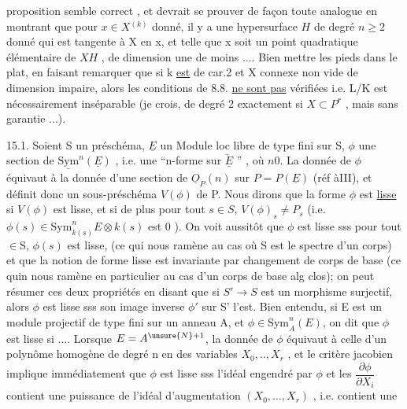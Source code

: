 
proposition semble correct , et devrait se prouver de façon toute analogue
en montrant que pour $x\in X$$^{(k)}$ donné, il y a une hypersurface $H$ de degré $n\geqslant 2$
donné qui est tangente à X en x, et telle que x soit un point quadratique
élémentaire de $X$\hand{\unsure{$\cap$}}$H$ , de dimension une de moins .... Bien mettre les
pieds dans le plat, en faisant remarquer que si k \uline{est} de car.2 et X
connexe non vide de dimension impaire, alors les conditions de 8.8. \uline{ne sont pas}
vérifiées i.e. L/K est nécessairement inséparable (je crois, de degré
2 exactement si $X\subset P^r$ , mais sans garantie ...).

15.1. Soient S un préschéma, $\underline{E}$ un Module loc libre de type fini
sur S, $\phi$ une section de $\underline{\mathrm{Sym}}^n(\underline{E})$ , i.e. une ``n-forme sur $\check{\underline{E}}$ '' , où $n$\unsure{$\geqslant$}$0$.
La donnée de $\phi$ équivaut à la donnée d'une section de $\underline{O}_P(n)$ sur $P=P(\underline{E})$
(réf àIII), et définit donc un sous-préschéma $V(\phi)$ de P. Nous dirons que
la forme $\phi$ est \uline{lisse} si $V(\phi)$ est lisse, et si de plus pour tout $s\in S$,
$V(\phi)_s\neq P_s$ (i.e. $\phi(s)\in \mathrm{Sym}^n_{k(s)}E\otimes k(s)$ est \unsure{$\neq$}$0$ ). On voit aussitôt
que $\phi$ est lisse sss pour tout  $\in$S, $\phi(s)$ est lisse, 
(ce qui nous ramène au cas où S est le spectre d'un corps) et
que la notion de forme lisse est invariante par changement de corps de
base (ce quin nous ramène en particulier au cas d'un corps de base alg
clos); on peut résumer ces deux propriétés en disant que si $S'\to S$ est
un morphisme surjectif, alors $\phi$ est lisse sss son image inverse $\phi'$ sur S'
l'est. Bien entendu, si E est un module projectif de type fini sur un
anneau A, et $\phi\in\mathrm{Sym}^n_A(E)$, on dit que $\phi$ est lisse si .... Lorsque $E=A^{\unsure{N}+1}$,
la donnée de $\phi$ équivaut à celle d'un polynôme homogène de degré n
en des variables $X_0,..,X_r$ , et le critère jacobien implique immédiatement
que  $\phi$ est lisse sss l'idéal engendré par $\phi$ et les $\dfrac{\partial\phi}{\partial X_i}$ contient
une puissance de l'idéal d'augmentation $(X_0,\dots,X_r)$ , i.e. contient une

 
